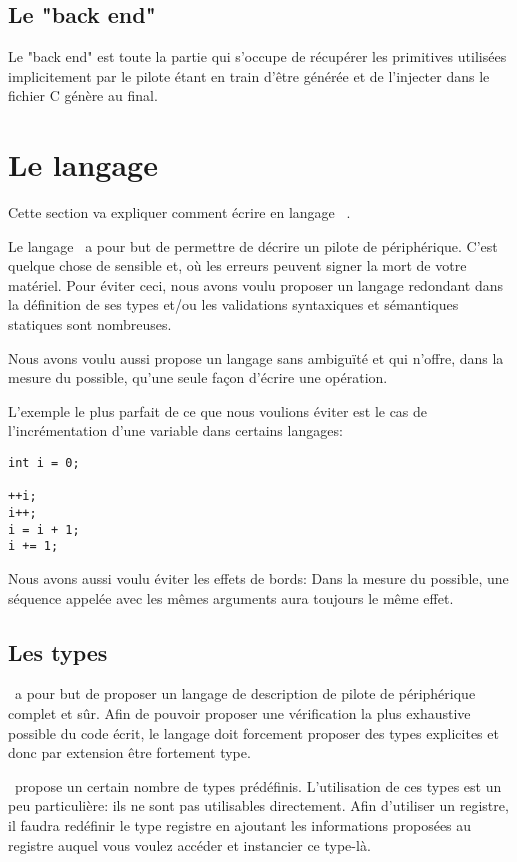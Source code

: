 \documentclass{rtxreport}
\begin{document}
\section{Le "back end"}

Le "back end" est toute la partie qui s'occupe de récupérer les primitives utilisées implicitement par
le pilote étant en train d'être générée et de l'injecter dans le fichier C génère au final.

\chapter{Le langage}

Cette section va expliquer comment écrire en langage \rtx\ .

Le langage \rtx\  a pour but de permettre de décrire un pilote de périphérique.
C'est quelque chose de sensible et, où les erreurs peuvent signer la mort de votre matériel.
Pour éviter ceci, nous avons voulu proposer un langage redondant dans la définition de ses types
et/ou les validations syntaxiques et sémantiques statiques sont nombreuses.

Nous avons voulu aussi propose un langage sans ambiguïté et qui n'offre, dans la mesure du possible,
qu'une seule façon d'écrire une opération.

L'exemple le plus parfait de ce que nous voulions éviter est le cas de l'incrémentation d'une variable dans certains
langages:

\lstset{language=C++}
\begin{lstlisting}
int i = 0;

++i;
i++;
i = i + 1;
i += 1;
\end{lstlisting}

\lstset{language=rathaxes}

Nous avons aussi voulu éviter les effets de bords:
Dans la mesure du possible, une séquence appelée avec les mêmes arguments aura toujours le même effet.

\section{Les types}
\rtx\  a pour but de proposer un langage de description de pilote de
périphérique complet et sûr.  Afin de pouvoir proposer une vérification la plus
exhaustive possible du code écrit, le langage doit forcement proposer des types
explicites et donc par extension être fortement type.

\rtx\  propose un certain nombre de types prédéfinis. L'utilisation de ces
types est un peu particulière: ils ne sont pas utilisables directement. Afin
d'utiliser un registre, il faudra redéfinir le type registre en ajoutant les
informations proposées au registre auquel vous voulez accéder et instancier ce
type-là.
\end{document}
